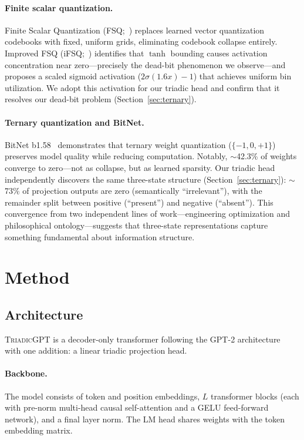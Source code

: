 \documentclass[11pt,a4paper]{article}
\newcommand{\microgpt}{\textsc{TriadicGPT}}
\begin{document}
\paragraph{Finite scalar quantization.}
Finite Scalar Quantization (FSQ;~\citealt{mentzer2024fsq}) replaces learned vector quantization codebooks with fixed, uniform grids, eliminating codebook collapse entirely. Improved FSQ (iFSQ;~\citealt{li2025ifsq}) identifies that $\tanh$ bounding causes activation concentration near zero---precisely the dead-bit phenomenon we observe---and proposes a scaled sigmoid activation ($2\sigma(1.6x)-1$) that achieves uniform bin utilization. We adopt this activation for our triadic head and confirm that it resolves our dead-bit problem (Section~\ref{sec:ternary}).

\paragraph{Ternary quantization and BitNet.}
BitNet b1.58~\citep{ma2024bitnet} demonstrates that ternary weight quantization ($\{-1, 0, +1\}$) preserves model quality while reducing computation. Notably, $\sim$42.3\% of weights converge to zero---not as collapse, but as learned sparsity. Our triadic head independently discovers the same three-state structure (Section~\ref{sec:ternary}): $\sim$73\% of projection outputs are zero (semantically ``irrelevant''), with the remainder split between positive (``present'') and negative (``absent''). This convergence from two independent lines of work---engineering optimization and philosophical ontology---suggests that three-state representations capture something fundamental about information structure.


\section{Method}
\label{sec:method}

\subsection{Architecture}
\label{sec:architecture}

\microgpt{} is a decoder-only transformer following the GPT-2 architecture~\citep{radford2019gpt2} with one addition: a linear triadic projection head.

\paragraph{Backbone.} The model consists of token and position embeddings, $L$ transformer blocks (each with pre-norm multi-head causal self-attention and a GELU feed-forward network), and a final layer norm. The LM head shares weights with the token embedding matrix.
\end{document}

